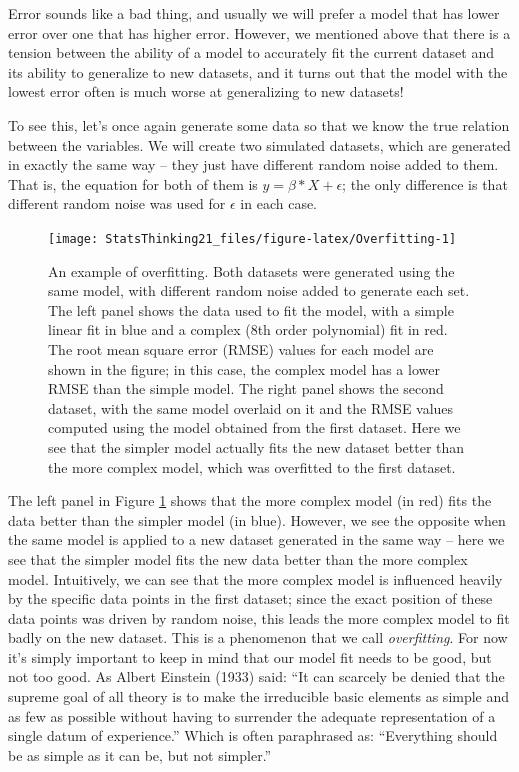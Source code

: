 \documentclass[
  12pt,
]{book}
\begin{document}
Error sounds like a bad thing, and usually we will prefer a model that has lower error over one that has higher error. However, we mentioned above that there is a tension between the ability of a model to accurately fit the current dataset and its ability to generalize to new datasets, and it turns out that the model with the lowest error often is much worse at generalizing to new datasets!

To see this, let's once again generate some data so that we know the true relation between the variables. We will create two simulated datasets, which are generated in exactly the same way -- they just have different random noise added to them. That is, the equation for both of them is \(y = \beta * X + \epsilon\); the only difference is that different random noise was used for \(\epsilon\) in each case.

\begin{figure}
\texttt{[image: StatsThinking21\_files/figure-latex/Overfitting-1]} \caption{An example of overfitting. Both datasets were generated using the same model, with different random noise added to generate each set.  The left panel shows the data used to fit the model, with a simple linear fit in blue and a complex (8th order polynomial) fit in red.  The root mean square error (RMSE) values for each model are shown in the figure; in this case, the complex model has a lower RMSE than the simple model.  The right panel shows the second dataset, with the same model overlaid on it and the RMSE values computed using the model obtained from the first dataset.  Here we see that the simpler model actually fits the new dataset better than the more complex model, which was overfitted to the first dataset.}\label{fig:Overfitting}
\end{figure}

The left panel in Figure \ref{fig:Overfitting} shows that the more complex model (in red) fits the data better than the simpler model (in blue). However, we see the opposite when the same model is applied to a new dataset generated in the same way -- here we see that the simpler model fits the new data better than the more complex model. Intuitively, we can see that the more complex model is influenced heavily by the specific data points in the first dataset; since the exact position of these data points was driven by random noise, this leads the more complex model to fit badly on the new dataset. This is a phenomenon that we call \emph{overfitting}. For now it's simply important to keep in mind that our model fit needs to be good, but not too good. As Albert Einstein (1933) said: ``It can scarcely be denied that the supreme goal of all theory is to make the irreducible basic elements as simple and as few as possible without having to surrender the adequate representation of a single datum of experience.'' Which is often paraphrased as: ``Everything should be as simple as it can be, but not simpler.''
\end{document}
